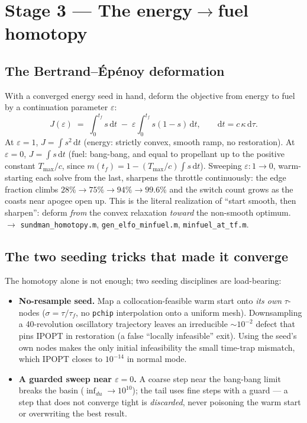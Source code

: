\documentclass[11pt]{article}
\newcommand{\code}[1]{\texttt{\small #1}}
\newcommand{\file}[1]{\texttt{\small #1}}
\newcommand{\Tmax}{T_{\max}}
\begin{document}
\section{Stage 3 --- The energy$\rightarrow$fuel homotopy}\label{sec:homotopy}

\subsection{The Bertrand--\'Ep\'enoy deformation}
With a converged energy seed in hand, deform the objective from energy to fuel by
a continuation parameter $\varepsilon$:
\begin{equation}
  J(\varepsilon) \;=\; \int_0^{t_f}\! s\,\mathrm{d}t
     \;-\; \varepsilon\!\int_0^{t_f}\! s(1-s)\,\mathrm{d}t,
  \qquad \mathrm{d}t = c\,\kappa\,\mathrm{d}\tau .
  \label{eq:homotopy}
\end{equation}
At $\varepsilon=1$, $J=\int s^2\,\mathrm{d}t$ (energy: strictly convex, smooth
ramp, no restoration). At $\varepsilon=0$, $J=\int s\,\mathrm{d}t$ (fuel:
bang-bang, and equal to propellant up to the positive constant $\Tmax/c$, since
$m(t_f)=1-(\Tmax/c)\int s\,\mathrm{d}t$). Sweeping $\varepsilon:1\!\to\!0$,
warm-starting each solve from the last, sharpens the throttle continuously: the
edge fraction climbs $28\%\!\to\!75\%\!\to\!94\%\!\to\!99.6\%$ and the switch
count grows as the coasts near apogee open up. This is the literal realization of
``start smooth, then sharpen'': deform \emph{from} the convex relaxation
\emph{toward} the non-smooth optimum. $\rightarrow$ \file{sundman\_homotopy.m},
\file{gen\_elfo\_minfuel.m}, \file{minfuel\_at\_tf.m}.

\subsection{The two seeding tricks that made it converge}
The homotopy alone is not enough; two seeding disciplines are load-bearing:
\begin{itemize}
  \item \textbf{No-resample seed.} Map a collocation-feasible warm start onto
        \emph{its own} $\tau$-nodes ($\sigma=\tau/\tau_f$, no \code{pchip}
        interpolation onto a uniform mesh). Downsampling a 40-revolution
        oscillatory trajectory leaves an irreducible $\sim\!10^{-2}$ defect that
        pins IPOPT in restoration (a false ``locally infeasible'' exit). Using
        the seed's own nodes makes the only initial infeasibility the small
        time-trap mismatch, which IPOPT closes to $10^{-14}$ in normal mode.
  \item \textbf{A guarded sweep near $\varepsilon=0$.} A coarse step near the
        bang-bang limit breaks the basin ($\inf_{du}\!\to\!10^{10}$); the tail
        uses fine steps with a guard --- a step that does not converge tight is
        \emph{discarded}, never poisoning the warm start or overwriting the best
        result.
\end{itemize}
\end{document}
